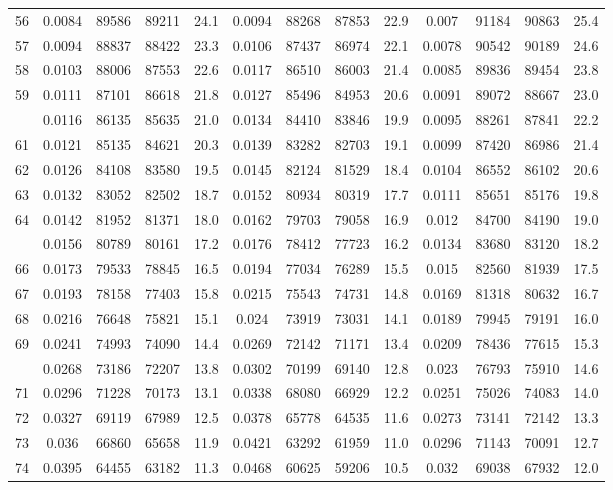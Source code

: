 \documentclass[
  14pt,
]{article}
\begin{document}
\begin{longtable}[t]{lcccccccccccc}
56 & 0.0084 & 89586 & 89211 & 24.1 & 0.0094 & 88268 & 87853 & 22.9 & 0.007 & 91184 & 90863 & 25.4\\
57 & 0.0094 & 88837 & 88422 & 23.3 & 0.0106 & 87437 & 86974 & 22.1 & 0.0078 & 90542 & 90189 & 24.6\\
58 & 0.0103 & 88006 & 87553 & 22.6 & 0.0117 & 86510 & 86003 & 21.4 & 0.0085 & 89836 & 89454 & 23.8\\
59 & 0.0111 & 87101 & 86618 & 21.8 & 0.0127 & 85496 & 84953 & 20.6 & 0.0091 & 89072 & 88667 & 23.0\\
\addlinespace
60 & 0.0116 & 86135 & 85635 & 21.0 & 0.0134 & 84410 & 83846 & 19.9 & 0.0095 & 88261 & 87841 & 22.2\\
61 & 0.0121 & 85135 & 84621 & 20.3 & 0.0139 & 83282 & 82703 & 19.1 & 0.0099 & 87420 & 86986 & 21.4\\
62 & 0.0126 & 84108 & 83580 & 19.5 & 0.0145 & 82124 & 81529 & 18.4 & 0.0104 & 86552 & 86102 & 20.6\\
63 & 0.0132 & 83052 & 82502 & 18.7 & 0.0152 & 80934 & 80319 & 17.7 & 0.0111 & 85651 & 85176 & 19.8\\
64 & 0.0142 & 81952 & 81371 & 18.0 & 0.0162 & 79703 & 79058 & 16.9 & 0.012 & 84700 & 84190 & 19.0\\
\addlinespace
65 & 0.0156 & 80789 & 80161 & 17.2 & 0.0176 & 78412 & 77723 & 16.2 & 0.0134 & 83680 & 83120 & 18.2\\
66 & 0.0173 & 79533 & 78845 & 16.5 & 0.0194 & 77034 & 76289 & 15.5 & 0.015 & 82560 & 81939 & 17.5\\
67 & 0.0193 & 78158 & 77403 & 15.8 & 0.0215 & 75543 & 74731 & 14.8 & 0.0169 & 81318 & 80632 & 16.7\\
68 & 0.0216 & 76648 & 75821 & 15.1 & 0.024 & 73919 & 73031 & 14.1 & 0.0189 & 79945 & 79191 & 16.0\\
69 & 0.0241 & 74993 & 74090 & 14.4 & 0.0269 & 72142 & 71171 & 13.4 & 0.0209 & 78436 & 77615 & 15.3\\
\addlinespace
70 & 0.0268 & 73186 & 72207 & 13.8 & 0.0302 & 70199 & 69140 & 12.8 & 0.023 & 76793 & 75910 & 14.6\\
71 & 0.0296 & 71228 & 70173 & 13.1 & 0.0338 & 68080 & 66929 & 12.2 & 0.0251 & 75026 & 74083 & 14.0\\
72 & 0.0327 & 69119 & 67989 & 12.5 & 0.0378 & 65778 & 64535 & 11.6 & 0.0273 & 73141 & 72142 & 13.3\\
73 & 0.036 & 66860 & 65658 & 11.9 & 0.0421 & 63292 & 61959 & 11.0 & 0.0296 & 71143 & 70091 & 12.7\\
74 & 0.0395 & 64455 & 63182 & 11.3 & 0.0468 & 60625 & 59206 & 10.5 & 0.032 & 69038 & 67932 & 12.0\\

\end{longtable}
\end{document}
